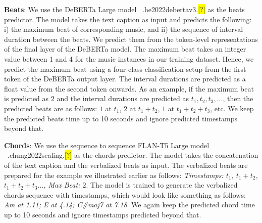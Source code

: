 \documentclass[11pt]{article}
\let\realcite\cite
\renewcommand{\cite}[1]{\ifx.#1.\hl{[?]}\else\realcite{#1}\fi}
\begin{document}
\textbf{Beats}: We use the DeBERTa Large model ~\cite{he2022debertav3} as the beats predictor. The model takes the text caption as input and predicts the following: i) the maximum beat of corresponding music, and ii) the sequence of interval duration between the beats. We predict them from the token-level representations of the final layer of the DeBERTa model. The maximum beat takes an integer value between 1 and 4 for the music instances in our training dataset. Hence, we predict the maximum beat using a four-class classification setup from the first token of the DeBERTa output layer. The interval durations are predicted as a float value from the second token onwards. As an example, if the maximum beat is predicted as $2$ and the interval durations are predicted as $t_1, t_2, t_3, \dots$, then the predicted beats are as follows: $1$ at $t_1$, $2$ at $t_1 + t_2$, $1$ at $t_1 + t_2 + t_3$, etc. We keep the predicted beats time up to 10 seconds and ignore predicted timestamps beyond that. 

\textbf{Chords}: We use the sequence to sequence FLAN-T5 Large model ~\cite{chung2022scaling} as the chords predictor. The model takes the concatenation of the text caption and the verbalized beats as input. The verbalized beats are prepared for the example we illustrated earlier as follows: \textit{Timestamps: $t_1$, $t_1+t_2$, $t_1+t_2+t_3 \dots$, Max Beat: $2$}. The model is trained to generate the verbalized chords sequence with timestamps, which would look like something as follows: \textit{Am at 1.11; E at 4.14; C\#maj7 at 7.18}. We again keep the predicted chord time up to 10 seconds and ignore timestamps predicted beyond that. 
\end{document}
